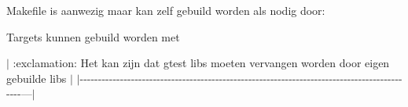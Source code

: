 Makefile is aanwezig maar kan zelf gebuild worden als nodig door\+:


\begin{DoxyCode}{0}

\end{DoxyCode}


Targets kunnen gebuild worden met 
\begin{DoxyCode}{0}

\end{DoxyCode}


$\vert$ \+:exclamation\+: Het kan zijn dat gtest libs moeten vervangen worden door eigen gebuilde libs $\vert$ $\vert$-\/-\/-\/-\/-\/-\/-\/-\/-\/-\/-\/-\/-\/-\/-\/-\/-\/-\/-\/-\/-\/-\/-\/-\/-\/-\/-\/-\/-\/-\/-\/-\/-\/-\/-\/-\/-\/-\/-\/-\/-\/-\/-\/-\/-\/-\/-\/-\/-\/-\/-\/-\/-\/-\/-\/-\/-\/-\/-\/-\/-\/-\/-\/-\/-\/-\/-\/-\/-\/-\/-\/-\/-\/-\/-\/-\/-\/-\/-\/-\/-\/-\/-\/-\/-\/-\/-\/-\/-\/-\/-\/-\/---$\vert$ 